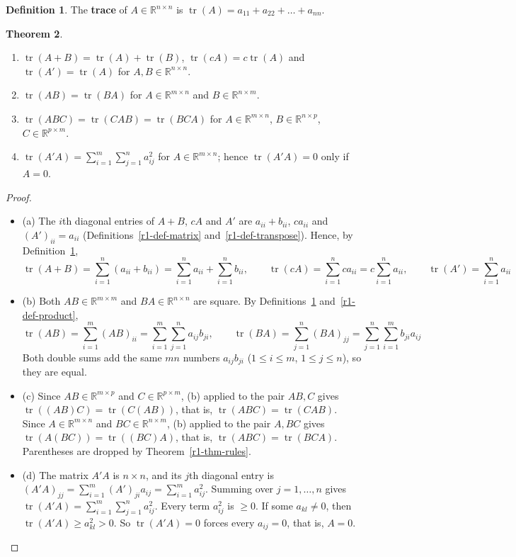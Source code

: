 \documentclass[12pt]{article}
\newcommand{\R}{\mathbb R}
\DeclareMathOperator{\tr}{tr}
\theoremstyle{definition}
\newtheorem{theorem}{Theorem}
\newtheorem{definition}[theorem]{Definition}
\begin{document}
\begin{definition}\label{r1-def-trace}
The \textbf{trace} of \(A\in\R^{n\times n}\) is \(\tr(A)=a_{11}+a_{22}+\dots+a_{nn}\).
\end{definition}

\begin{theorem}\label{r1-thm-trace}
\begin{enumerate}
\item \(\tr(A+B)=\tr(A)+\tr(B)\), \(\tr(cA)=c\tr(A)\) and \(\tr(A')=\tr(A)\) for
\(A,B\in\R^{n\times n}\).
\item \(\tr(AB)=\tr(BA)\) for \(A\in\R^{m\times n}\) and \(B\in\R^{n\times m}\).
\item \(\tr(ABC)=\tr(CAB)=\tr(BCA)\) for \(A\in\R^{m\times n}\), \(B\in\R^{n\times p}\),
\(C\in\R^{p\times m}\).
\item \(\tr(A'A)=\sum_{i=1}^m\sum_{j=1}^na_{ij}^2\) for \(A\in\R^{m\times n}\); hence
\(\tr(A'A)=0\) only if \(A=0\).
\end{enumerate}
\end{theorem}
\begin{proof}
\begin{itemize}
\item (a) The \(i\)th diagonal entries of \(A+B\), \(cA\) and \(A'\) are \(a_{ii}+b_{ii}\),
\(ca_{ii}\) and \((A')_{ii}=a_{ii}\) (Definitions~\ref{r1-def-matrix}
and~\ref{r1-def-transpose}). Hence, by Definition~\ref{r1-def-trace},
\[
\tr(A+B)=\sum_{i=1}^n(a_{ii}+b_{ii})=\sum_{i=1}^na_{ii}+\sum_{i=1}^nb_{ii},\qquad
\tr(cA)=\sum_{i=1}^nca_{ii}=c\sum_{i=1}^na_{ii},\qquad
\tr(A')=\sum_{i=1}^na_{ii}
\]
\item (b) Both \(AB\in\R^{m\times m}\) and \(BA\in\R^{n\times n}\) are square. By
Definitions~\ref{r1-def-trace} and~\ref{r1-def-product},
\[
\tr(AB)=\sum_{i=1}^m(AB)_{ii}=\sum_{i=1}^m\sum_{j=1}^na_{ij}b_{ji},\qquad
\tr(BA)=\sum_{j=1}^n(BA)_{jj}=\sum_{j=1}^n\sum_{i=1}^mb_{ji}a_{ij}
\]
Both double sums add the same \(mn\) numbers \(a_{ij}b_{ji}\)
(\(1\leqslant i\leqslant m\), \(1\leqslant j\leqslant n\)), so they are equal.
\item (c) Since \(AB\in\R^{m\times p}\) and \(C\in\R^{p\times m}\), (b) applied to the pair
\(AB,C\) gives \(\tr((AB)C)=\tr(C(AB))\), that is, \(\tr(ABC)=\tr(CAB)\). Since
\(A\in\R^{m\times n}\) and \(BC\in\R^{n\times m}\), (b) applied to the pair \(A,BC\) gives
\(\tr(A(BC))=\tr((BC)A)\), that is, \(\tr(ABC)=\tr(BCA)\). Parentheses are dropped by
Theorem~\ref{r1-thm-rules}.
\item (d) The matrix \(A'A\) is \(n\times n\), and its \(j\)th diagonal entry is
\((A'A)_{jj}=\sum_{i=1}^m(A')_{ji}a_{ij}=\sum_{i=1}^ma_{ij}^2\). Summing over
\(j=1,\dots,n\) gives \(\tr(A'A)=\sum_{i=1}^m\sum_{j=1}^na_{ij}^2\). Every term
\(a_{ij}^2\) is \(\geqslant0\). If some \(a_{kl}\ne0\), then
\(\tr(A'A)\geqslant a_{kl}^2>0\). So \(\tr(A'A)=0\) forces every \(a_{ij}=0\), that is,
\(A=0\).\qedhere
\end{itemize}
\end{proof}
\end{document}
